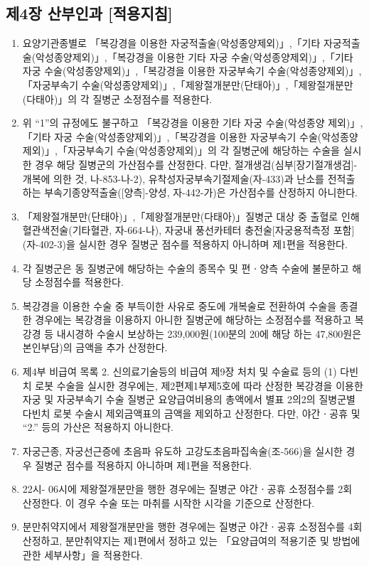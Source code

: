 \subsection{제4장 산부인과 [적용지침]}
\begin{enumerate}[1.]\tightlist
\item 요양기관종별로 「복강경을 이용한 자궁적출술(악성종양제외)」,「기타 자궁적출술(악성종양제외)」,「복강경을 이용한 기타 자궁 수술(악성종양제외)」,「기타 자궁 수술(악성종양제외)」,「복강경을 이용한 자궁부속기 수술(악성종양제외)」,「자궁부속기 수술(악성종양제외)」,「제왕절개분만(단태아)」,「제왕절개분만(다태아)」의 각 질병군 소정점수를 적용한다.
\item 위 “1”의 규정에도 불구하고 「복강경을 이용한 기타 자궁 수술(악성종양 제외)」,「기타 자궁 수술(악성종양제외)」,「복강경을 이용한 자궁부속기 수술(악성종양제외)」,「자궁부속기 수술(악성종양제외)」의 각 질병군에 해당하는 수술을 실시한 경우 해당 질병군의 가산점수를 산정한다. 다만, 절개생검(심부[장기절개생검]-개복에 의한 것, 나-853-나-2), 유착성자궁부속기절제술(자-433)과 난소를 전적출하는 부속기종양적출술([양측]-양성, 자-442-가)은 가산점수를 산정하지 아니한다.
\item 「제왕절개분만(단태아)」,「제왕절개분만(다태아)」질병군 대상 중 출혈로 인해 혈관색전술(기타혈관, 자-664-나), 자궁내 풍선카테터 충전술[자궁용적측정 포함](자-402-3)을 실시한 경우 질병군 점수를 적용하지 아니하며 제1편을 적용한다.
\item 각 질병군은 동 질병군에 해당하는 수술의 종목수 및 편ㆍ양측 수술에 불문하고 해당 소정점수를 적용한다.
\item 복강경을 이용한 수술 중 부득이한 사유로 중도에 개복술로 전환하여 수술을 종결한 경우에는 복강경을 이용하지 아니한 질병군에 해당하는 소정점수를 적용하고 복강경 등 내시경하 수술시 보상하는 239,000원(100분의 20에 해당 하는 47,800원은 본인부담)의 금액을 추가 산정한다.
\item 제4부 비급여 목록 2. 신의료기술등의 비급여 제9장 처치 및 수술료 등의 (1) 다빈치 로봇 수술을 실시한 경우에는, 제2편제1부제5호에 따라 산정한 복강경을 이용한 자궁 및 자궁부속기 수술 질병군 요양급여비용의 총액에서 별표 2의2의 질병군별 다빈치 로봇 수술시 제외금액표의 금액을 제외하고 산정한다. 다만, 야간ㆍ공휴 및 “2.” 등의 가산은 적용하지 아니한다.
\item 자궁근종, 자궁선근증에 초음파 유도하 고강도초음파집속술(조-566)을 실시한 경우 질병군 점수를 적용하지 아니하며 제1편을 적용한다.
\item 22시- 06시에 제왕절개분만을 행한 경우에는 질병군 야간ㆍ공휴 소정점수를 2회 산정한다. 이 경우 수술 또는 마취를 시작한 시각을 기준으로 산정한다.
\item 분만취약지에서 제왕절개분만을 행한 경우에는 질병군 야간ㆍ공휴 소정점수를 4회 산정하고, 분만취약지는 제1편에서 정하고 있는 「요양급여의 적용기준 및 방법에 관한 세부사항」을 적용한다.
\end{enumerate}